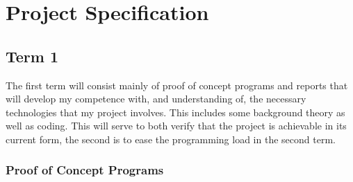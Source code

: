 \documentclass[]{../resources/final_report}
\begin{document}

\chapter{Project Specification}

\section{Term 1}

The first term will consist mainly of proof of concept programs and reports that will develop my competence with, and understanding of, the necessary technologies that my project involves. This includes some background theory as well as coding. This will serve to both verify that the project is achievable in its current form, the second is to ease the programming load in the second term.

\subsection{Proof of Concept Programs}
\end{document}
